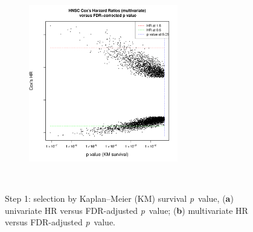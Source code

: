 \documentclass[
paper=landscape,
paper=160mm:90mm, %
fontsize=11pt, %
pagesize, %
parskip=half-, %
]{scrartcl} %
\theoremstyle{mythmstyle} %
\begin{document}
\begin{figure}[ht]
\begin{subfigure}[t]{0.45\textwidth}
    \end{subfigure} \hfill
    \begin{subfigure}[t]{0.45\textwidth}
        \includegraphics[width=6.5cm]{Rplot02_FDRP_multiHR.pdf}
    \end{subfigure} \\

\caption{
Step 1: selection by Kaplan--Meier (KM) survival \textit{p}~value, 
(\textbf{a}) univariate HR versus FDR-adjusted \textit{p}~value; (\textbf{b}) multivariate HR versus FDR-adjusted \textit{p}~value.}

\end{figure}
\end{document}
